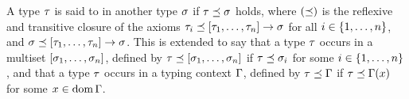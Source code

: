 \begin{definition}
A type $\tau$ is said to  in another type $\sigma$ if
$\tau \preceq \sigma$ holds,
where $(\preceq)$ is the reflexive and transitive closure of
the axioms
$\tau_i \preceq [\tau_1,\hdots,\tau_n] \to \sigma$ for all $i \in \{1,\hdots,n\}$,
and $\sigma \preceq [\tau_1,\hdots,\tau_n] \to \sigma$.
This is extended to say that a type $\tau$ occurs in a multiset $[\sigma_1,\hdots,\sigma_n]$,
defined by $\tau \preceq [\sigma_1,\hdots,\sigma_n]$ if $\tau \preceq \sigma_i$
for some $i\in\{1,\hdots,n\}$,
and that a type $\tau$ occurs in a typing context $\Gamma$,
defined by $\tau \preceq \Gamma$ if $\tau \preceq \Gamma(x)$ for some $x \in \operatorname{dom}\Gamma$.
\end{definition}
